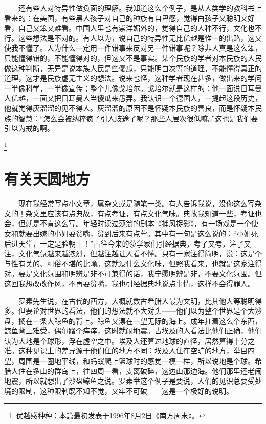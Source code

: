 　　还有些人对特异性做负面的理解。我知道这么个例子，是从人类学的教科书上看来的：在美国，有些黑人孩子对自己的种族有自卑感，觉得白孩子又聪明又好看，自己又笨又难看。中国人里也有崇洋媚外的，觉得自己的人种不行，文化也不行。这些想法是不对的。有人以为，说自己的特异性无比优越是惟一的出路，这又使我不懂了。人为什么一定用一件错事来反对另一件错事呢？除非人真是这么笨，只能懂得错的，不能懂得对的，但这又不是事实。某个民族的学者对本民族的人民做这种判断，无异是说本族人民是些傻瓜，只能明白次等的道理，不能懂得真正的道理，这才是民族虚无主义的想法。说来也怪，这种学者现在甚多，做出来的学问一半像科学，一半像宣传；整个儿像戈培尔。戈培尔就是这样的：他一面说日耳曼人优越，一面又把日耳曼人当傻瓜来愚弄。我认识一个德国人，一提起这段历史，他就觉得灰溜溜的见不得人。灰溜溜的原因不是怀疑本民族的善良，而是怀疑本民族的智慧：“怎么会被纳粹疯子引入歧途了呢？那些人层次很低嘛。”这也是我们要引以为戒的啊。

\footnote{优越感种种：本篇最初发表于1996年8月2日《南方周末》。}

\chapter{有关天圆地方}

　　现在我经常写点小文章，属杂文或是随笔一类。有人告诉我说，没你这么写杂文的！杂文里应该有点典故，有点考证，有点文化气味。典故我知道一些，考证也会，但就是不肯这么写。年轻时读过莎翁的剧本《捕风捉影》，有一场戏是一个使女和就要出嫁的小姐耍贫嘴，贫到后来有点荤。其中有一句是这么说的：“小姐死后进天堂，一定是脸朝上！”古往今来的莎学家们引经据典，考了又考，注了又注，文化气氛越来越浓烈，但越注越让人看不懂。只有一家注得简明，说：这是个与性有关的、粗俗不堪的比喻。这就没什么文化味，但照我看来，也就是这家注得对。要是文化氛围和明辨是非不可兼得的话，我宁愿明辨是非，不要文化氛围。但这回我想改改作风，不再耍贫嘴，我也引经据典地说点事情，这样不会得罪人。

　　罗素先生说，在古代的西方，大概就数古希腊人最为文明，比其他人等聪明得多。但要论对世界的看法，他们的想法就不大对头——他们以为整个世界是个大沙盘，搁在一条大鲸鱼的背上。鲸鱼又漂在一望无际的海上。成年扛着这么个东西，鲸鱼背上难受，偶尔蹭个痒痒，这时就闹地震。古埃及的人看法比他们正确，他们认为大地是个球形，浮在虚空之中。埃及人还算过地球的直径，居然算得十分之准。这种见识上的差异源于他们住的地方不同：埃及人住在空旷的地方，举目四望，周围是一圈地平线，和蚂蚁爬上篮球时的感觉一模一样，所以说地是个球。希腊人住在多山的群岛上，往四周一看，支离破碎，这边山那边海。他们那里还老闹地震，所以就想出了沙盘鲸鱼之说。罗素举这个例子是要说，人们的见识总要受处境的限制，这种限制既不知不觉，又牢不可破——这是一个极好的说明。

